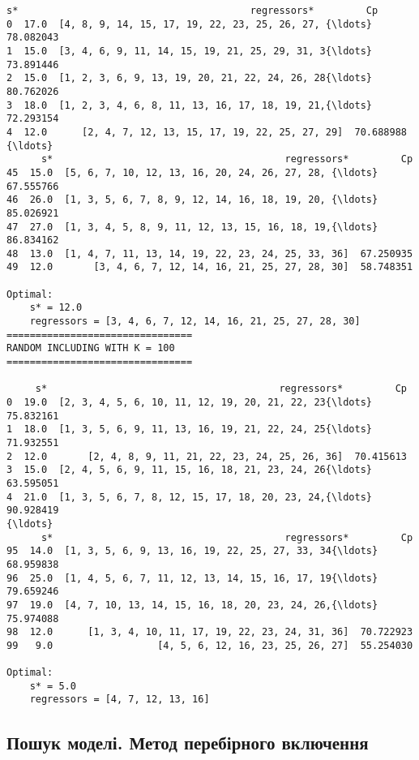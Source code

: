 \documentclass[11pt]{article}
\begin{document}
\begin{Verbatim}[commandchars=\\\{\}]
     s*                                        regressors*         Cp
0  17.0  [4, 8, 9, 14, 15, 17, 19, 22, 23, 25, 26, 27, {\ldots}  78.082043
1  15.0  [3, 4, 6, 9, 11, 14, 15, 19, 21, 25, 29, 31, 3{\ldots}  73.891446
2  15.0  [1, 2, 3, 6, 9, 13, 19, 20, 21, 22, 24, 26, 28{\ldots}  80.762026
3  18.0  [1, 2, 3, 4, 6, 8, 11, 13, 16, 17, 18, 19, 21,{\ldots}  72.293154
4  12.0      [2, 4, 7, 12, 13, 15, 17, 19, 22, 25, 27, 29]  70.688988
{\ldots}
      s*                                        regressors*         Cp
45  15.0  [5, 6, 7, 10, 12, 13, 16, 20, 24, 26, 27, 28, {\ldots}  67.555766
46  26.0  [1, 3, 5, 6, 7, 8, 9, 12, 14, 16, 18, 19, 20, {\ldots}  85.026921
47  27.0  [1, 3, 4, 5, 8, 9, 11, 12, 13, 15, 16, 18, 19,{\ldots}  86.834162
48  13.0  [1, 4, 7, 11, 13, 14, 19, 22, 23, 24, 25, 33, 36]  67.250935
49  12.0       [3, 4, 6, 7, 12, 14, 16, 21, 25, 27, 28, 30]  58.748351

Optimal:
	s* = 12.0
	regressors = [3, 4, 6, 7, 12, 14, 16, 21, 25, 27, 28, 30]
================================
RANDOM INCLUDING WITH K = 100
================================

     s*                                        regressors*         Cp
0  19.0  [2, 3, 4, 5, 6, 10, 11, 12, 19, 20, 21, 22, 23{\ldots}  75.832161
1  18.0  [1, 3, 5, 6, 9, 11, 13, 16, 19, 21, 22, 24, 25{\ldots}  71.932551
2  12.0       [2, 4, 8, 9, 11, 21, 22, 23, 24, 25, 26, 36]  70.415613
3  15.0  [2, 4, 5, 6, 9, 11, 15, 16, 18, 21, 23, 24, 26{\ldots}  63.595051
4  21.0  [1, 3, 5, 6, 7, 8, 12, 15, 17, 18, 20, 23, 24,{\ldots}  90.928419
{\ldots}
      s*                                        regressors*         Cp
95  14.0  [1, 3, 5, 6, 9, 13, 16, 19, 22, 25, 27, 33, 34{\ldots}  68.959838
96  25.0  [1, 4, 5, 6, 7, 11, 12, 13, 14, 15, 16, 17, 19{\ldots}  79.659246
97  19.0  [4, 7, 10, 13, 14, 15, 16, 18, 20, 23, 24, 26,{\ldots}  75.974088
98  12.0      [1, 3, 4, 10, 11, 17, 19, 22, 23, 24, 31, 36]  70.722923
99   9.0                  [4, 5, 6, 12, 16, 23, 25, 26, 27]  55.254030

Optimal:
	s* = 5.0
	regressors = [4, 7, 12, 13, 16]

    \end{Verbatim}

    \subsection{Пошук моделі. Метод перебірного
включення}\label{ux43fux43eux448ux443ux43a-ux43cux43eux434ux435ux43bux456.-ux43cux435ux442ux43eux434-ux43fux435ux440ux435ux431ux456ux440ux43dux43eux433ux43e-ux432ux43aux43bux44eux447ux435ux43dux43dux44f}
\end{document}
